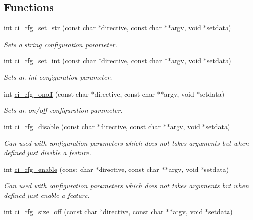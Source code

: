 \subsection*{Functions}
\begin{DoxyCompactItemize}
\item 
int \hyperlink{group__CONFIG_ga6f436fc4f3cee87e4b70a5bef389b45f}{ci\_\-cfg\_\-set\_\-str} (const char $\ast$directive, const char $\ast$$\ast$argv, void $\ast$setdata)
\begin{DoxyCompactList}\small\item\em Sets a string configuration parameter. \item\end{DoxyCompactList}\item 
int \hyperlink{group__CONFIG_gae235e03dc945cafe02704d0fee3d561b}{ci\_\-cfg\_\-set\_\-int} (const char $\ast$directive, const char $\ast$$\ast$argv, void $\ast$setdata)
\begin{DoxyCompactList}\small\item\em Sets an int configuration parameter. \item\end{DoxyCompactList}\item 
int \hyperlink{group__CONFIG_ga583eafc74c32ad5120e355f0e6bc5084}{ci\_\-cfg\_\-onoff} (const char $\ast$directive, const char $\ast$$\ast$argv, void $\ast$setdata)
\begin{DoxyCompactList}\small\item\em Sets an on/off configuration parameter. \item\end{DoxyCompactList}\item 
int \hyperlink{group__CONFIG_ga110890915e5fc860a97cb89d6eb0b6bd}{ci\_\-cfg\_\-disable} (const char $\ast$directive, const char $\ast$$\ast$argv, void $\ast$setdata)
\begin{DoxyCompactList}\small\item\em Can used with configuration parameters which does not takes arguments but when defined just disable a feature. \item\end{DoxyCompactList}\item 
int \hyperlink{group__CONFIG_ga6353b524c48945e300d4dca23aff9b8a}{ci\_\-cfg\_\-enable} (const char $\ast$directive, const char $\ast$$\ast$argv, void $\ast$setdata)
\begin{DoxyCompactList}\small\item\em Can used with configuration parameters which does not takes arguments but when defined just enable a feature. \item\end{DoxyCompactList}\item 
\hypertarget{group__CONFIG_ga2d172584ad74e85373f307680117ab54}{
int \hyperlink{group__CONFIG_ga2d172584ad74e85373f307680117ab54}{ci\_\-cfg\_\-size\_\-off} (const char $\ast$directive, const char $\ast$$\ast$argv, void $\ast$setdata)}
\label{group__CONFIG_ga2d172584ad74e85373f307680117ab54}


\end{DoxyCompactItemize}
